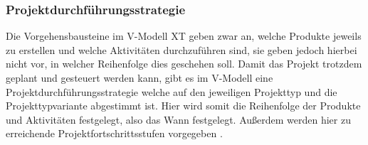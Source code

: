  \subsubsection{Projektdurchführungsstrategie}
 Die Vorgehensbausteine im V-Modell XT geben zwar an, welche Produkte jeweils zu erstellen und welche Aktivitäten durchzuführen sind, sie geben jedoch hierbei nicht vor, in welcher Reihenfolge dies geschehen soll. Damit das Projekt trotzdem geplant und gesteuert werden kann, gibt es im V-Modell eine Projektdurchführungsstrategie welche auf den jeweiligen Projekttyp und die Projekttypvariante abgestimmt ist. Hier wird somit die Reihenfolge der Produkte und Aktivitäten festgelegt, also das  \grqq Wann\grqq {} festgelegt. Außerdem werden hier zu erreichende Projektfortschrittsstufen vorgegeben \cite{2004vmodell}. \newline
 
